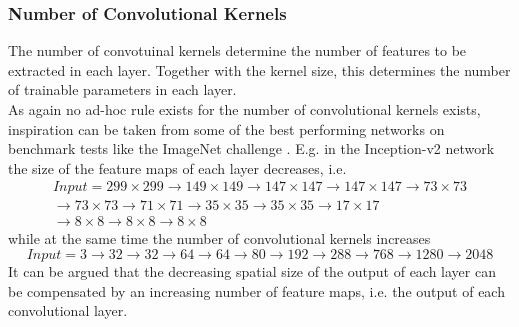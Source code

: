  
\subsubsection{Number of Convolutional Kernels}
The number of convotuinal kernels determine the number of features to be extracted in each layer. Together with the kernel size, this determines the number of trainable parameters in each layer. \\

As again no ad-hoc rule exists for the number of convolutional kernels exists, inspiration can be taken from some of the best performing networks on benchmark tests like the ImageNet challenge \cite{imagenet_cvpr09}. E.g. in the Inception-v2 \cite{Szegedy2015} network the size of the feature maps of each layer decreases, i.e. 
\begin{equation*}
\begin{split}
Input = 299 \times 299 \rightarrow 149 \times 149 \rightarrow 147\times 147 \rightarrow 147\times 147 \rightarrow 73\times 73 \\
\rightarrow 73\times 73 \rightarrow 71\times 71 \rightarrow 35\times 35 \rightarrow 35\times 35 \rightarrow 17\times 17 \\ \rightarrow 8\times 8 \rightarrow 8\times 8 \rightarrow 8\times 8
\end{split}
\end{equation*}
while at the same time the number of convolutional kernels increases
\begin{equation*}
Input = 3 \rightarrow 32 \rightarrow 32 \rightarrow 64 \rightarrow 64 \rightarrow 80 \rightarrow 192 \rightarrow 288 \rightarrow 768 \rightarrow 1280 \rightarrow 2048
\end{equation*}
It can be argued that the decreasing spatial size of the output of each layer can be compensated by an increasing number of feature maps, i.e. the output of each convolutional layer. 

%

